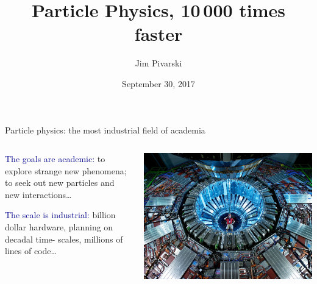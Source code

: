 \documentclass[aspectratio=169]{beamer}
\title[2017-09-29-strangeloop]{Particle Physics, 10\,000 times faster}
\author{Jim Pivarski}
\institute{Princeton University -- DIANA}
\date{September 30, 2017}
\begin{document}

\begin{frame}
  \titlepage
\end{frame}




\begin{frame}{Particle physics: the most industrial field of academia}
\vspace{0.15 cm}
\begin{columns}
\begin{center}
\begin{minipage}{0.8\linewidth}

\textcolor{darkblue}{The goals are academic:} to explore strange new phenomena; to seek out new particles and new \mbox{interactions\ldots}

\vspace{0.5 cm}
\textcolor{darkblue}{The scale is industrial:} \mbox{billion} dollar hardware, planning on decadal time- scales, \mbox{millions} of lines of code\ldots

\vspace{0.5 cm}
\end{minipage}
\end{center}

\includegraphics[width=\linewidth]{lhc-industrial-2.jpg}

\end{columns}
\end{frame}
\end{document}
